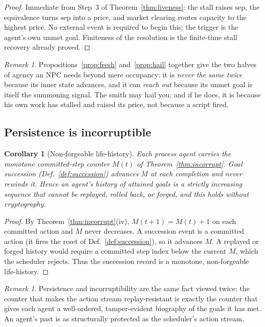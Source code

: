 \documentclass[11pt,twocolumn,a4paper]{article}
\theoremstyle{plain}
\newtheorem{corollary}[theorem]{Corollary}
\theoremstyle{definition}
\theoremstyle{remark}
\newtheorem{remark}[theorem]{Remark}
\newcommand{\sep}{\mathrm{sep}}
\begin{document}
\begin{proof}
Immediate from Step~3 of Theorem~\ref{thm:liveness}: the stall raises $\sep$, the
equivalence turns $\sep$ into a price, and market clearing routes capacity to the
highest price. No external event is required to begin this; the trigger is the
agent's own unmet goal. Finiteness of the resolution is the finite-time stall
recovery already proved.
\end{proof}

\begin{remark}
Propositions~\ref{prop:fresh} and~\ref{prop:hail} together give the two halves of
agency an NPC needs beyond mere occupancy: it is \emph{never the same twice}
because its inner state advances, and it can \emph{reach out} because its unmet
goal is itself the summoning signal. The smith may hail you; and if he does, it is
because his own work has stalled and raised its price, not because a script fired.
\end{remark}

\subsection{Persistence is incorruptible}

\begin{corollary}[Non-forgeable life-history]
\label{cor:lifehistory}
Each process agent carries the monotone committed-step counter $M(t)$ of
Theorem~\ref{thm:incorrupt}. Goal succession (Def.~\ref{def:succession}) advances
$M$ at each completion and never rewinds it. Hence an agent's history of attained
goals is a strictly increasing sequence that cannot be replayed, rolled back, or
forged, and this holds without cryptography.
\end{corollary}

\begin{proof}
By Theorem~\ref{thm:incorrupt}(iv), $M(t+1) = M(t) + 1$ on each committed action and
$M$ never decreases. A succession event is a committed action (it fires the reset of
Def.~\ref{def:succession}), so it advances $M$. A replayed or forged history would
require a committed step index below the current $M$, which the scheduler rejects.
Thus the succession record is a monotone, non-forgeable life-history.
\end{proof}

\begin{remark}
Persistence and incorruptibility are the same fact viewed twice: the counter that
makes the action stream replay-resistant is exactly the counter that gives each
agent a well-ordered, tamper-evident biography of the goals it has met. An agent's
past is as structurally protected as the scheduler's action stream.
\end{remark}
\end{document}
